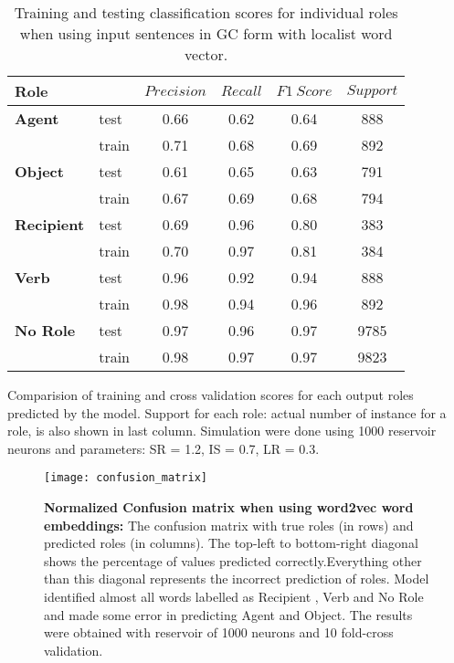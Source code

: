 \begin{table}
\centering
\begin{threeparttable}
\caption{Training and testing classification scores for individual roles when using input sentences in GC form with localist word vector.}
\label{tab:classsification-scores-22}
\begin{tabular}{llcccc}
\toprule
Role & & \( Precision \) & \( Recall \) & \( F1 \ Score \) & \( Support \) \\
\midrule                 
\textbf{Agent}		&test 	& 0.66 & 0.62 & 0.64 & 888 \\
					&train 	& 0.71 & 0.68 & 0.69 & 892 \\
\textbf{Object}		&test 	& 0.61 & 0.65 & 0.63 & 791 \\
					&train 	& 0.67 & 0.69 & 0.68 & 794 \\
\textbf{Recipient}	&test 	& 0.69 & 0.96 & 0.80 & 383 \\
					&train 	& 0.70 & 0.97 & 0.81 & 384 \\
\textbf{Verb}		&test 	& 0.96 & 0.92 & 0.94 & 888 \\
					&train 	& 0.98 & 0.94 & 0.96 & 892 \\
\textbf{No Role}	&test 	& 0.97 & 0.96 & 0.97 & 9785 \\
					&train 	& 0.98 & 0.97 & 0.97 & 9823 \\
\bottomrule
\end{tabular}
\begin{tablenotes}
\small
\item Comparision of training and cross validation scores for each output roles predicted by the model. Support for each role: actual number of instance for a role, is also shown in last column. Simulation were done using 1000 reservoir neurons and parameters: SR = 1.2, IS = 0.7, LR = 0.3.
\end{tablenotes}
\end{threeparttable}
\end{table}

\begin{figure}[hbtp]
\centering
\texttt{[image: confusion\_matrix]}
\caption{\textbf{Normalized Confusion matrix when using word2vec word embeddings:} The confusion matrix with true roles (in rows) and predicted roles (in columns). The top-left to bottom-right diagonal shows the percentage of values predicted correctly.Everything other than this diagonal represents the incorrect prediction of roles. Model identified almost all words labelled as Recipient , Verb and No Role and made some error in predicting Agent and Object. The results were obtained with reservoir of 1000 neurons and 10 fold-cross validation.}
\label{fig:confusion_matrix}
\end{figure}

